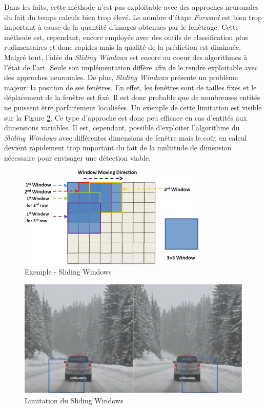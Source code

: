 \noindent Dans les faits, cette méthode n'est pas exploitable avec des approches neuronales du fait du temps calculs bien trop élevé. Le nombre d'étape \textit{Forward} est bien trop important à cause de la quantité d'images obtenues par le fenêtrage. Cette méthode est, cependant, encore employée avec des outils de classification plus rudimentaires et donc rapides mais la qualité de la prédiction est diminuée. Malgré tout, l'idée du \textit{Sliding Windows} est encore au coeur des algorithmes à l'état de l'art. Seule son implémentation diffère afin de le rendre exploitable avec des approches neuronales. De plus, \textit{Sliding Windows} présente un problème majeur: la position de ses fenêtres. En effet, les fenêtres sont de tailles fixes et le déplacement de la fenêtre est fixé. Il est donc probable que de nombreuses entités ne puissent être parfaitement localisées. Un exemple de cette limitation est visible sur la Figure \ref{slidewindconvyl}. Ce type d'approche est donc peu efficace en cas d'entités aux dimensions variables. Il est, cependant, possible d'exploiter l'algorithme du \textit{Sliding Windows} avec différentes dimensions de fenêtre mais le coût en calcul devient rapidement trop important du fait de la multitude de dimension nécessaire pour envisager une détection viable.

\begin{figure}
    \centering
    \includegraphics[scale=1]{./tex/computer-vision/object-recognition/slidewin.jpg}
    \caption{Exemple - Sliding Windows}
    \label{slidewind}
\end{figure}

\begin{figure}
    \centering
    \includegraphics[scale=0.4]{./tex/computer-vision/object-recognition/yl1.png}
    \caption{Limitation du Sliding Windows}
    \label{slidewindconvyl}
\end{figure}

